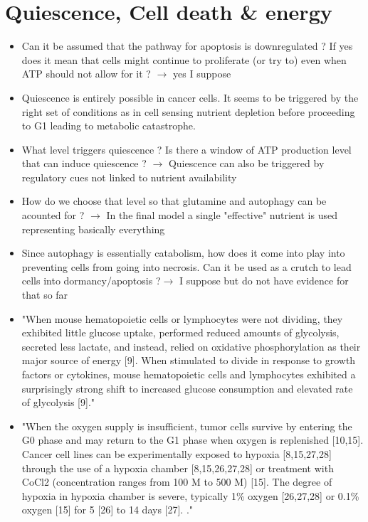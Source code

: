 \documentclass[11pt,a4paper]{article}
\begin{document}
\section{Quiescence, Cell death \& energy}
\begin{itemize}
\item Can it be assumed that the pathway for apoptosis is downregulated ? If yes does it mean that cells might continue to proliferate (or try to) even when ATP should not allow for it ? $\rightarrow$ yes I suppose
\item Quiescence is entirely possible in cancer cells. It seems to be triggered by the right set of conditions as in cell sensing nutrient depletion before proceeding to G1 leading to metabolic catastrophe.
\item What level triggers quiescence ? Is there a window of ATP production level that can induce quiescence ? $\rightarrow$ Quiescence can also be triggered by regulatory cues not linked to nutrient availability
\item How do we choose that level so that glutamine and autophagy can be acounted for ? $\rightarrow$ In the final model a single "effective" nutrient is used representing basically everything
\item Since autophagy is essentially catabolism, how does it come into play into preventing cells from going into necrosis. Can it be used as a crutch to lead cells into dormancy/apoptosis ?$\rightarrow$ I suppose but do not have evidence for that so far
\item "When mouse hematopoietic cells or lymphocytes were not dividing, they exhibited little glucose uptake, performed reduced amounts of glycolysis, secreted less lactate, and instead, relied on oxidative phosphorylation as their major source of energy [9]. When stimulated to divide in response to growth factors or cytokines, mouse hematopoietic cells and lymphocytes exhibited a surprisingly strong shift to increased glucose consumption and elevated rate of glycolysis [9]."\cite{Coller2019}
\item "When the oxygen supply is insufficient, tumor cells survive by entering the G0 phase and may return to the G1 phase when oxygen is replenished [10,15]. Cancer cell lines can be experimentally exposed to hypoxia [8,15,27,28] through the use of a hypoxia chamber [8,15,26,27,28] or treatment with CoCl2 (concentration ranges from 100 \textmu M to 500 \textmu M) [15]. The degree of hypoxia in hypoxia chamber is severe, typically 1\% oxygen [26,27,28] or 0.1\% oxygen [15] for 5 [26] to 14 days [27]. ."\cite{Nabil2021}

\end{itemize}
\end{document}
